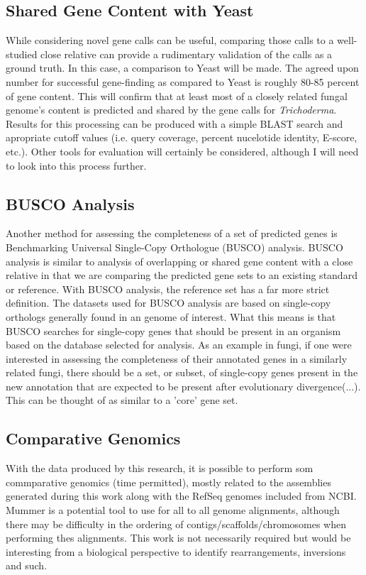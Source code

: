 \subsection{Shared Gene Content with Yeast}

While considering novel gene calls can be useful, comparing those
calls to a well-studied close relative can provide a rudimentary
validation of the calls as a ground truth. In this case, a comparison
to Yeast will be made. The agreed upon number for successful
gene-finding as compared to Yeast is roughly 80-85 percent of gene
content. This will confirm that at least most of a closely related
fungal genome's content is predicted and shared by the gene calls for
\textit{Trichoderma}. Results for this processing can be produced with
a simple BLAST search and apropriate cutoff values (i.e. query
coverage, percent nucelotide identity, E-score, etc.). Other tools for
evaluation will certainly be considered, although I will need to look
into this process further.

\subsection{BUSCO Analysis}
Another method for assessing the completeness of a set of predicted
genes is Benchmarking Universal Single-Copy Orthologue (BUSCO)
analysis\cite{10.1093/molbev/msab199}. BUSCO analysis is similar to
analysis of overlapping or shared gene content with a close relative
in that we are comparing the predicted gene sets to an existing
standard or reference. With BUSCO analysis, the reference set has a
far more strict definition. The datasets used for BUSCO analysis are
based on single-copy orthologs generally found in an genome of
interest. What this means is that BUSCO searches for single-copy genes
that should be present in an organism based on the database selected
for analysis. As an example in fungi, if one were interested in
assessing the completeness of their annotated genes in a similarly
related fungi, there should be a set, or subset, of single-copy genes
present in the new annotation that are expected to be present after
evolutionary divergence(...). This can be thought of as similar to a
'core' gene set.

\subsection{Comparative Genomics}

With the data produced by this research, it is possible to perform som
commparative genomics (time permitted), mostly related to the
assemblies generated during this work along with the RefSeq genomes
included from NCBI. Mummer is a potential tool to use for all to all
genome alignments, although there may be difficulty in the ordering of
contigs/scaffolds/chromosomes when performing thes alignments. This
work is not necessarily required but would be interesting from a
biological perspective to identify rearrangements, inversions and
such.
